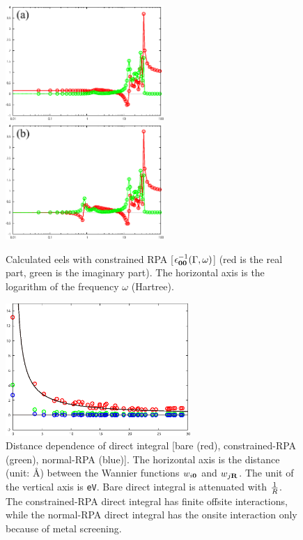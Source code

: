 \documentclass{article}
\begin{document}
\begin{figure}[H] 
\centering
\includegraphics[width=6cm]{eels-cRPA-La2CuO4.eps}
\includegraphics[width=6cm]{eels-fRPA-La2CuO4.eps}
\caption{Calculated eels with constrained RPA [$\epsilon_{{\bf 00}}^{-1}(\Gamma, \omega)$] (red is the real part, green is the imaginary part). The horizontal axis is the logarithm of the frequency $\omega$ (Hartree).}
\label{eels-cRPA-La2CuO4}
\end{figure}
\begin{figure}[H] 
\centering
\includegraphics[width=7cm]{WvsR-La2CuO4.eps}
\caption{Distance dependence of direct integral [bare (red), constrained-RPA (green), normal-RPA (blue)]. The horizontal axis is the distance (unit: \AA) between the Wannier functions $w_{i{\bf 0}}$ and $w_{j{\bf R}}$. The unit of the vertical axis is {\tt eV}. Bare direct integral is attenuated with ${\Huge \frac{1}{R}}$. The constrained-RPA direct integral has finite offsite interactions, while the normal-RPA direct integral has the onsite interaction only because of metal screening.}
\label{WvsR-La2CuO4}
\end{figure}
\end{document}
